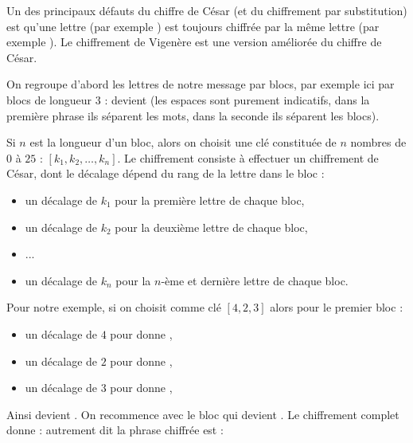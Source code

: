 \documentclass[11pt,class=report,crop=false]{standalone}
\begin{document}


\begin{cours}
	

 Un des principaux défauts du chiffre de César (et du chiffrement par substitution) est qu'une lettre (par exemple ) est toujours chiffrée par la même lettre (par exemple ). Le chiffrement de Vigenère est une version améliorée du chiffre de César.
 
On regroupe d'abord les lettres de notre message par blocs, par exemple ici par blocs de longueur $3$ :
devient
(les espaces sont purement indicatifs, dans la première phrase ils séparent les mots, dans la seconde ils séparent les blocs).


Si $n$ est la longueur d'un bloc, alors on choisit une clé constituée de $n$ nombres de $0$ à $25$ :
$[k_1,k_2,\ldots,k_n]$. Le chiffrement consiste à effectuer un chiffrement de César, dont le décalage dépend du rang de la lettre dans le bloc :
\begin{itemize}
  \item un décalage de $k_1$ pour la première lettre de chaque bloc,
  \item un décalage de $k_2$ pour la deuxième lettre de chaque bloc,
  \item ...
  \item un décalage de $k_n$ pour la $n$-ème et dernière lettre de chaque bloc.
\end{itemize}

\bigskip

Pour notre exemple, si on choisit comme clé $[4,2,3]$ alors
pour le premier bloc \og{}\fg{} :
\begin{itemize}
  \item un décalage de $4$ pour  donne ,
  \item un décalage de $2$ pour  donne ,
  \item un décalage de $3$ pour  donne ,
\end{itemize}

Ainsi \og{}\fg{} devient \og{}\fg{}.
On recommence avec le bloc \og{}\fg{} qui devient \og{}\fg{}. Le chiffrement complet donne :
autrement dit la phrase chiffrée est :



\end{cours}
\end{document}

